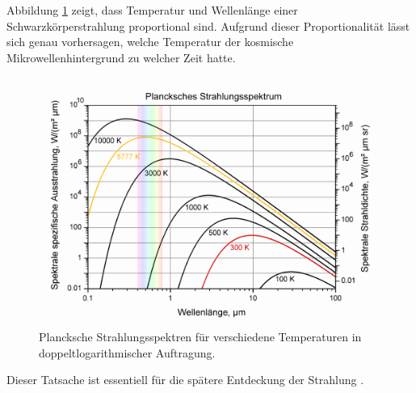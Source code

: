 Abbildung \ref{fig:blackbody_spectrum} zeigt, dass Temperatur und Wellenlänge einer Schwarzkörperstrahlung proportional sind.
Aufgrund dieser Proportionalität lässt sich genau vorhersagen, welche Temperatur der kosmische Mikrowellenhintergrund zu welcher Zeit hatte.
\begin{figure}
	\centering
	\includegraphics[width=0.7\linewidth]{cmb/images/blackbody_spectrum.png}
	\caption{Plancksche Strahlungsspektren für verschiedene Temperaturen in 
	doppeltlogarithmischer Auftragung.}
	\label{fig:blackbody_spectrum}
\end{figure}
Dieser Tatsache ist essentiell für die spätere Entdeckung der Strahlung
\cite{cmb:intro}.
